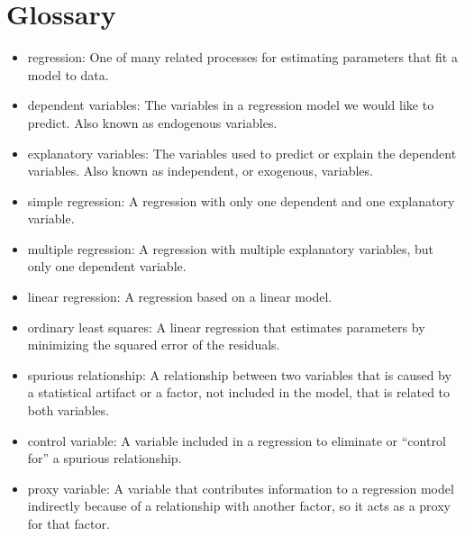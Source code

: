 \documentclass[12pt]{book}
\begin{document}
\section{Glossary}

\begin{itemize}

\item regression: One of many related processes for estimating parameters
that fit a model to data.

\item dependent variables: The variables in a regression model we would
like to predict.  Also known as endogenous variables.

\item explanatory variables: The variables used to predict or explain
the dependent variables.  Also known as independent, or exogenous,
variables.

\item simple regression: A regression with only one dependent and
one explanatory variable.

\item multiple regression: A regression with multiple explanatory
variables, but only one dependent variable.

\item linear regression: A regression based on a linear model.

\item ordinary least squares: A linear regression that estimates
parameters by minimizing the squared error of the residuals.

\item spurious relationship: A relationship between two variables that is 
caused by a statistical artifact or a factor, not included in the
model, that is related to both variables.

\item control variable: A variable included in a regression to
eliminate or ``control for'' a spurious relationship.

\item proxy variable: A variable that contributes information to
a regression model indirectly because of a relationship with another
factor, so it acts as a proxy for that factor.


\end{itemize}
\end{document}
